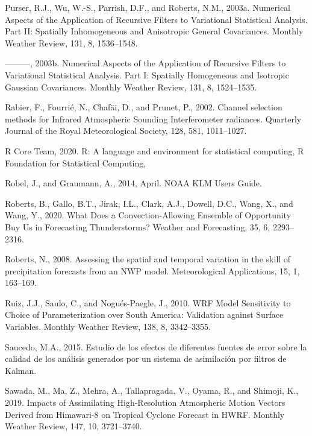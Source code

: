 \documentclass[12pt,oneside,a4paper]{reedthesis}
\begin{document}
\leavevmode\hypertarget{ref-purser2003a}{}%
Purser, R.J., Wu, W.-S., Parrish, D.F., and Roberts, N.M., 2003a. Numerical Aspects of the Application of Recursive Filters to Variational Statistical Analysis. Part II: Spatially Inhomogeneous and Anisotropic General Covariances. Monthly Weather Review, 131, 8, 1536--1548.

\leavevmode\hypertarget{ref-purser2003}{}%
---------, 2003b. Numerical Aspects of the Application of Recursive Filters to Variational Statistical Analysis. Part I: Spatially Homogeneous and Isotropic Gaussian Covariances. Monthly Weather Review, 131, 8, 1524--1535.

\leavevmode\hypertarget{ref-rabier2002}{}%
Rabier, F., Fourrié, N., Chafäi, D., and Prunet, P., 2002. Channel selection methods for Infrared Atmospheric Sounding Interferometer radiances. Quarterly Journal of the Royal Meteorological Society, 128, 581, 1011--1027.

\leavevmode\hypertarget{ref-rcoreteam2020}{}%
R Core Team, 2020. R: A language and environment for statistical computing, R Foundation for Statistical Computing,

\leavevmode\hypertarget{ref-robel2014}{}%
Robel, J., and Graumann, A., 2014, April. NOAA KLM Users Guide.

\leavevmode\hypertarget{ref-roberts2020}{}%
Roberts, B., Gallo, B.T., Jirak, I.L., Clark, A.J., Dowell, D.C., Wang, X., and Wang, Y., 2020. What Does a Convection-Allowing Ensemble of Opportunity Buy Us in Forecasting Thunderstorms? Weather and Forecasting, 35, 6, 2293--2316.

\leavevmode\hypertarget{ref-roberts2008}{}%
Roberts, N., 2008. Assessing the spatial and temporal variation in the skill of precipitation forecasts from an NWP model. Meteorological Applications, 15, 1, 163--169.

\leavevmode\hypertarget{ref-ruiz2010}{}%
Ruiz, J.J., Saulo, C., and Nogués-Paegle, J., 2010. WRF Model Sensitivity to Choice of Parameterization over South America: Validation against Surface Variables. Monthly Weather Review, 138, 8, 3342--3355.

\leavevmode\hypertarget{ref-saucedo2015}{}%
Saucedo, M.A., 2015. Estudio de los efectos de diferentes fuentes de error sobre la calidad de los análisis generados por un sistema de asimilación por filtros de Kalman.

\leavevmode\hypertarget{ref-sawada2019}{}%
Sawada, M., Ma, Z., Mehra, A., Tallapragada, V., Oyama, R., and Shimoji, K., 2019. Impacts of Assimilating High-Resolution Atmospheric Motion Vectors Derived from Himawari-8 on Tropical Cyclone Forecast in HWRF. Monthly Weather Review, 147, 10, 3721--3740.
\end{document}
